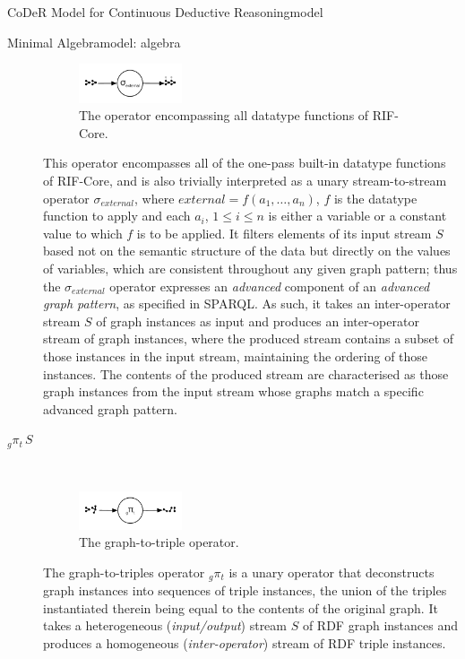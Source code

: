 \begin{nestedsection}{CoDeR Model for Continuous Deductive Reasoning}{model}
\begin{nestedsection}{Minimal Algebra}{model: algebra}
\begin{description}
\begin{figure}[b]
					\centering
					\includegraphics[width=0.3\textwidth]{datatype-function}
					\caption{The operator encompassing all datatype functions of RIF-Core.}
				\end{figure}
				This operator encompasses all of the one-pass built-in datatype functions of RIF-Core, and is also trivially interpreted as a unary stream-to-stream operator $\sigma_{external}$, where ${external = f(a_1,\dots,a_n)}$, $f$ is the datatype function to apply and each $a_i$, ${1 \leq i \leq n}$ is either a variable or a constant value to which $f$ is to be applied.
				It filters elements of its input stream $S$ based not on the semantic structure of the data but directly on the values of variables, which are consistent throughout any given graph pattern;
				thus the $\sigma_{external}$ operator expresses an \emph{advanced} component of an \emph{advanced graph pattern}, as specified in SPARQL.
				As such, it takes an inter-operator stream $S$ of graph instances as input and produces an inter-operator stream of graph instances, where the produced stream contains a subset of those instances in the input stream, maintaining the ordering of those instances.
				The contents of the produced stream are characterised as those graph instances from the input stream whose graphs match a specific advanced graph pattern.
			\item[${{}_g{\pi_t}\,S}$] \hfill \\
				\begin{figure}[t]
					\centering
					\includegraphics[width=0.3\textwidth]{graph-to-triple}
					\caption{The graph-to-triple operator.}
				\end{figure}
				The graph-to-triples operator ${{}_g{\pi_t}}$ is a unary operator that deconstructs graph instances into sequences of triple instances, the union of the triples instantiated therein being equal to the contents of the original graph.
				It takes a heterogeneous (\emph{input/output}) stream $S$ of RDF graph instances and produces a homogeneous (\emph{inter-operator}) stream of RDF triple instances.

\end{description}
\end{nestedsection}
\end{nestedsection}
